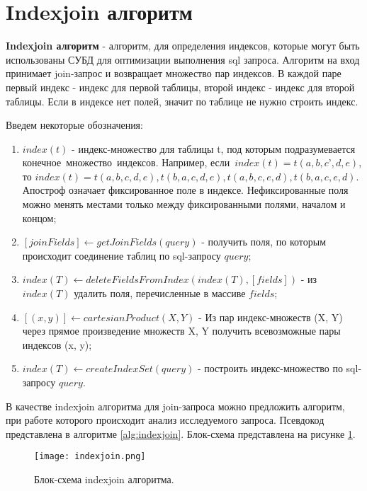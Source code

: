 \section{Indexjoin алгоритм}

\textbf{Indexjoin алгоритм} - алгоритм, для определения индексов, которые могут быть использованы СУБД для оптимизации выполнения sql запроса. Алгоритм на вход принимает join-запрос и возвращает множество пар индексов. В каждой паре первый индекс - индекс для первой таблицы, второй индекс - индекс для второй таблицы. Если в индексе нет полей, значит по таблице не нужно строить индекс. 

Введем некоторые обозначения:
\begin{enumerate}
\item $index(t)$ - индекс-множество для таблицы t, под которым подразумевается конечное множество индексов. Например, если $index(t) = t(a, b, c’, d, e)$, то $index(t) = {t(a, b, c, d, e), t(b, a, c, d, e), t(a, b, c, e, d), t(b, a, c, e, d)}$. Апостроф означает фиксированное поле в индексе. Нефиксированные поля можно менять местами только между фиксированными полями, началом и концом;

\item $[joinFields] \gets getJoinFields(query)$ - получить поля, по которым происходит соединение таблиц по sql-запросу $query$;

\item $index(T) \gets deleteFieldsFromIndex(index(T), [fields])$ - из $index(T)$  удалить поля, перечисленные в массиве $fields$;

\item  $[(x, y)] \gets cartesianProduct(X, Y)$ - Из пар индекс-множеств (X, Y) через прямое произведение множеств X, Y получить всевозможные пары индексов (x, y);

\item $index(T) \gets createIndexSet(query)$ - построить индекс-множество  по sql-запросу $query$.
\end{enumerate}

В качестве indexjoin алгоритма для join-запроса можно предложить алгоритм, при работе которого происходит анализ исследуемого запроса. Псевдокод представлена в алгоритме \ref{alg:indexjoin}. Блок-схема представлена на рисунке \ref{img:indexjoin}.

\begin{figure}[h]
  \centering
  \texttt{[image: indexjoin.png]}
  \caption{Блок-схема indexjoin алгоритма.}
  \label{img:indexjoin}
\end{figure}

